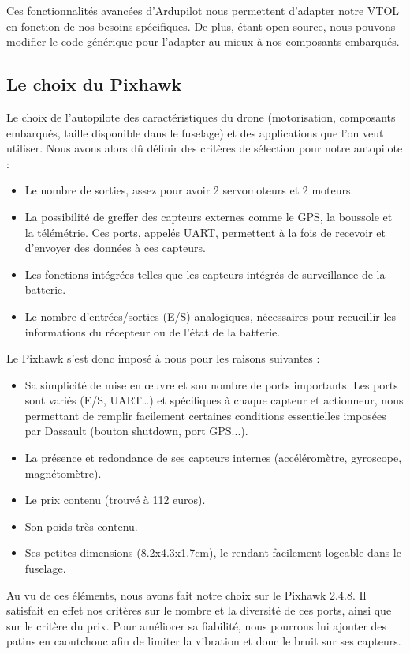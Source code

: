 \documentclass[a4paper,12pt,french]{report}
\begin{document}
Ces fonctionnalités avancées d’Ardupilot nous permettent d’adapter notre VTOL en fonction de nos besoins spécifiques. De plus, étant open source, nous pouvons modifier le code générique pour l’adapter au mieux à nos composants embarqués.

\subsection{Le choix du Pixhawk}

Le choix de l’autopilote des caractéristiques du drone (motorisation, composants embarqués, taille disponible dans le fuselage) et des applications que l’on veut utiliser.\newline
Nous avons alors dû définir des critères de sélection pour notre autopilote : \newline
\begin{itemize}
    \item Le nombre de sorties, assez pour avoir 2 servomoteurs et 2 moteurs.
    \item La possibilité de greffer des capteurs externes comme le GPS, la boussole et la télémétrie. Ces ports, appelés UART, permettent à la fois de recevoir et d'envoyer des données à ces capteurs.
    \item Les fonctions intégrées telles que les capteurs intégrés de surveillance de la batterie.
    \item Le nombre d'entrées/sorties (E/S) analogiques, nécessaires pour recueillir les informations du récepteur ou de l'état de la batterie.\newline
\end{itemize}

Le Pixhawk s’est donc imposé à nous pour les raisons suivantes :\newline
\begin{itemize}
    \item Sa simplicité de mise en œuvre et son nombre de ports importants. Les ports sont variés (E/S, UART…) et spécifiques à chaque capteur et actionneur, nous permettant de remplir facilement certaines conditions essentielles imposées par Dassault (bouton shutdown, port GPS...).
    \item La présence et redondance de ses capteurs internes (accéléromètre, gyroscope, magnétomètre).
    \item Le prix contenu (trouvé à 112 euros).
    \item Son poids très contenu.
    \item Ses petites dimensions (8.2x4.3x1.7cm), le rendant facilement logeable dans le fuselage.
\end{itemize}
Au vu de ces éléments, nous avons fait notre choix sur le Pixhawk 2.4.8. Il satisfait en effet nos critères sur le nombre et la diversité de ces ports, ainsi que sur le critère du prix. Pour améliorer sa fiabilité, nous pourrons lui ajouter des patins en caoutchouc afin de limiter la vibration et donc le bruit sur ses capteurs.
\end{document}
